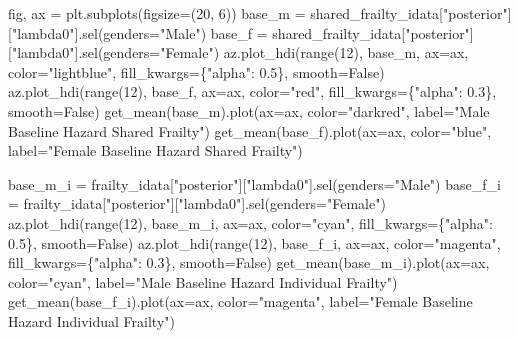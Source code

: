 \documentclass[
  letterpaper,
  DIV=11,
  numbers=noendperiod]{scrartcl}
\newenvironment{Shaded}{\begin{snugshade}}{\end{snugshade}}
\newcommand{\BuiltInTok}[1]{\textcolor[rgb]{0.00,0.23,0.31}{#1}}
\newcommand{\DecValTok}[1]{\textcolor[rgb]{0.68,0.00,0.00}{#1}}
\newcommand{\FloatTok}[1]{\textcolor[rgb]{0.68,0.00,0.00}{#1}}
\newcommand{\NormalTok}[1]{\textcolor[rgb]{0.00,0.23,0.31}{#1}}
\newcommand{\OperatorTok}[1]{\textcolor[rgb]{0.37,0.37,0.37}{#1}}
\newcommand{\StringTok}[1]{\textcolor[rgb]{0.13,0.47,0.30}{#1}}
\newcommand{\VariableTok}[1]{\textcolor[rgb]{0.07,0.07,0.07}{#1}}
\begin{document}
\begin{Shaded}
\begin{Highlighting}[]
\NormalTok{fig, ax }\OperatorTok{=}\NormalTok{ plt.subplots(figsize}\OperatorTok{=}\NormalTok{(}\DecValTok{20}\NormalTok{, }\DecValTok{6}\NormalTok{))}
\NormalTok{base\_m }\OperatorTok{=}\NormalTok{ shared\_frailty\_idata[}\StringTok{"posterior"}\NormalTok{][}\StringTok{"lambda0"}\NormalTok{].sel(genders}\OperatorTok{=}\StringTok{"Male"}\NormalTok{)}
\NormalTok{base\_f }\OperatorTok{=}\NormalTok{ shared\_frailty\_idata[}\StringTok{"posterior"}\NormalTok{][}\StringTok{"lambda0"}\NormalTok{].sel(genders}\OperatorTok{=}\StringTok{"Female"}\NormalTok{)}
\NormalTok{az.plot\_hdi(}\BuiltInTok{range}\NormalTok{(}\DecValTok{12}\NormalTok{), base\_m, ax}\OperatorTok{=}\NormalTok{ax, color}\OperatorTok{=}\StringTok{"lightblue"}\NormalTok{, fill\_kwargs}\OperatorTok{=}\NormalTok{\{}\StringTok{"alpha"}\NormalTok{: }\FloatTok{0.5}\NormalTok{\}, smooth}\OperatorTok{=}\VariableTok{False}\NormalTok{)}
\NormalTok{az.plot\_hdi(}\BuiltInTok{range}\NormalTok{(}\DecValTok{12}\NormalTok{), base\_f, ax}\OperatorTok{=}\NormalTok{ax, color}\OperatorTok{=}\StringTok{"red"}\NormalTok{, fill\_kwargs}\OperatorTok{=}\NormalTok{\{}\StringTok{"alpha"}\NormalTok{: }\FloatTok{0.3}\NormalTok{\}, smooth}\OperatorTok{=}\VariableTok{False}\NormalTok{)}
\NormalTok{get\_mean(base\_m).plot(ax}\OperatorTok{=}\NormalTok{ax, color}\OperatorTok{=}\StringTok{"darkred"}\NormalTok{, label}\OperatorTok{=}\StringTok{"Male Baseline Hazard Shared Frailty"}\NormalTok{)}
\NormalTok{get\_mean(base\_f).plot(ax}\OperatorTok{=}\NormalTok{ax, color}\OperatorTok{=}\StringTok{"blue"}\NormalTok{, label}\OperatorTok{=}\StringTok{"Female Baseline Hazard Shared Frailty"}\NormalTok{)}

\NormalTok{base\_m\_i }\OperatorTok{=}\NormalTok{ frailty\_idata[}\StringTok{"posterior"}\NormalTok{][}\StringTok{"lambda0"}\NormalTok{].sel(genders}\OperatorTok{=}\StringTok{"Male"}\NormalTok{)}
\NormalTok{base\_f\_i }\OperatorTok{=}\NormalTok{ frailty\_idata[}\StringTok{"posterior"}\NormalTok{][}\StringTok{"lambda0"}\NormalTok{].sel(genders}\OperatorTok{=}\StringTok{"Female"}\NormalTok{)}
\NormalTok{az.plot\_hdi(}\BuiltInTok{range}\NormalTok{(}\DecValTok{12}\NormalTok{), base\_m\_i, ax}\OperatorTok{=}\NormalTok{ax, color}\OperatorTok{=}\StringTok{"cyan"}\NormalTok{, fill\_kwargs}\OperatorTok{=}\NormalTok{\{}\StringTok{"alpha"}\NormalTok{: }\FloatTok{0.5}\NormalTok{\}, smooth}\OperatorTok{=}\VariableTok{False}\NormalTok{)}
\NormalTok{az.plot\_hdi(}\BuiltInTok{range}\NormalTok{(}\DecValTok{12}\NormalTok{), base\_f\_i, ax}\OperatorTok{=}\NormalTok{ax, color}\OperatorTok{=}\StringTok{"magenta"}\NormalTok{, fill\_kwargs}\OperatorTok{=}\NormalTok{\{}\StringTok{"alpha"}\NormalTok{: }\FloatTok{0.3}\NormalTok{\}, smooth}\OperatorTok{=}\VariableTok{False}\NormalTok{)}
\NormalTok{get\_mean(base\_m\_i).plot(ax}\OperatorTok{=}\NormalTok{ax, color}\OperatorTok{=}\StringTok{"cyan"}\NormalTok{, label}\OperatorTok{=}\StringTok{"Male Baseline Hazard Individual Frailty"}\NormalTok{)}
\NormalTok{get\_mean(base\_f\_i).plot(ax}\OperatorTok{=}\NormalTok{ax, color}\OperatorTok{=}\StringTok{"magenta"}\NormalTok{, label}\OperatorTok{=}\StringTok{"Female Baseline Hazard Individual Frailty"}\NormalTok{)}



\end{Highlighting}
\end{Shaded}
\end{document}
